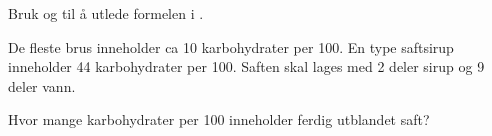 Bruk  og  til å utlede formelen i . 

De fleste brus inneholder ca 10 karbohydrater per 100. En type saftsirup inneholder 44 karbohydrater per 100. Saften skal lages med 2 deler sirup og 9 deler vann. \os

Hvor mange karbohydrater per 100 inneholder ferdig utblandet saft? \os




